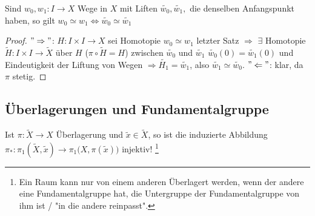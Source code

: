 \documentclass[a4paper,11pt,notitlepage]{report}
\theoremstyle{definition}
\begin{document}
\begin{theorem}
	Sind $w_0, w_1 \colon I \rightarrow X$ Wege in $X$ mit Liften $\widetilde{w_0}, \widetilde{w_1},$ die denselben Anfangspunkt haben, so gilt $w_0 \simeq w_1 \Leftrightarrow \widetilde{w_0} \simeq \widetilde{w_1}$
\end{theorem}

\begin{proof}
	$"\Rightarrow"$: $H \colon I \times I \rightarrow X$ sei Homotopie $w_0 \simeq w_1$ letzter Satz $\Rightarrow$ $\exists$ Homotopie $\widetilde{H} \colon I \times I \rightarrow \widetilde{X}$ über $H$ ($\pi \circ \widetilde{H} = H$) zwischen $\widetilde{w_0}$ und $\widetilde{w_1}$
	\newline
	$\widetilde{w_0}(0) = \widetilde{w_1}(0)$ und Eindeutigkeit der Liftung von Wegen $\Rightarrow \widetilde{H_1} = \widetilde{w_1}$, also $\widetilde{w_1} \simeq \widetilde{w_0}$.
	\newline
	$"\Leftarrow"$: klar, da $\pi$ stetig.
\end{proof}

\subsection{Überlagerungen und Fundamentalgruppe}
\begin{theorem}
	Ist $\pi \colon \widetilde{X} \rightarrow X$ Überlagerung und $\widetilde{x} \in \widetilde{X}$, so ist die induzierte Abbildung $\pi_* \colon \pi_1(\widetilde{X},\widetilde{x}) \rightarrow \pi_1\big(X, \pi(\widetilde{x})\big)$ injektiv! \footnote{Ein Raum kann nur von einem anderen Überlagert werden, wenn der andere eine Fundamentalgruppe hat, die Untergruppe der Fundamentalgruppe von ihm ist / "in die andere reinpasst".}
\end{theorem}
\end{document}
